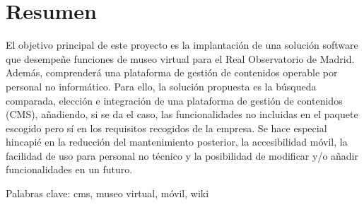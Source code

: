 \section{Resumen}

\par El objetivo principal de este proyecto es la implantación de una solución software que desempeñe funciones de museo virtual para el Real Observatorio de Madrid. Además, comprenderá una plataforma de gestión de contenidos operable por personal no informático.
Para ello, la solución propuesta es la búsqueda comparada, elección e integración de una plataforma de gestión de contenidos (CMS), añadiendo, si se da el caso, las funcionalidades no incluidas en el paquete escogido pero sí en los requisitos recogidos de la empresa.
Se hace especial hincapié en la reducción del mantenimiento posterior, la accesibilidad móvil, la facilidad de uso para personal no técnico y la posibilidad de modificar y/o añadir funcionalidades en un futuro.

\par Palabras clave: cms, museo virtual, móvil, wiki